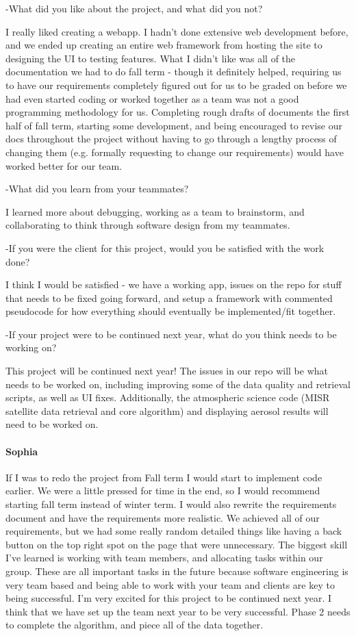 \documentclass[onecolumn, draftclsnofoot,10pt, compsoc]{IEEEtran}
\begin{document}
\begin{flushleft}
-What did you like about the project, and what did you not?
 
I really liked creating a webapp. I hadn't done extensive web development before, and we ended up creating an entire web framework from hosting the site to designing the UI to testing features. What I didn't like was all of the documentation we had to do fall term - though it definitely helped, requiring us to have our requirements completely figured out for us to be graded on before we had even started coding or worked together as a team was not a good programming methodology for us. Completing rough drafts of documents the first half of fall term, starting some development, and being encouraged to revise our docs throughout the project without having to go through a lengthy process of changing them (e.g. formally requesting to change our requirements) would have worked better for our team.
 
-What did you learn from your teammates?
 
I learned more about debugging, working as a team to brainstorm, and collaborating to think through software design from my teammates.
 
-If you were the client for this project, would you be satisfied with the work done?
 
I think I would be satisfied - we have a working app, issues on the repo for stuff that needs to be fixed going forward, and setup a framework with commented pseudocode for how everything should eventually be implemented/fit together.
 
-If your project were to be continued next year, what do you think needs to be working on?
 
This project will be continued next year! The issues in our repo will be what needs to be worked on, including improving some of the data quality and retrieval scripts, as well as UI fixes. Additionally, the atmospheric science code (MISR satellite data retrieval and core algorithm) and displaying aerosol results will need to be worked on.
 
\paragraph{Sophia}
If I was to redo the project from Fall term I would start to implement code earlier. We were a little pressed for time in the end, so I would recommend starting fall term instead of winter term. I would also rewrite the requirements document and have the requirements more realistic. We achieved all of our requirements, but we had some really random detailed things like having a back button on the top right spot on the page that were unnecessary. The biggest skill I've learned is working with team members, and allocating tasks within our group. These are all important tasks in the future because software engineering is very team based and being able to work with your team and clients are key to being successful. I'm very excited for this project to be continued next year. I think that we have set up the team next year to be very successful. Phase 2 needs to complete the algorithm, and piece all of the data together.
 

\end{flushleft}
\end{document}
